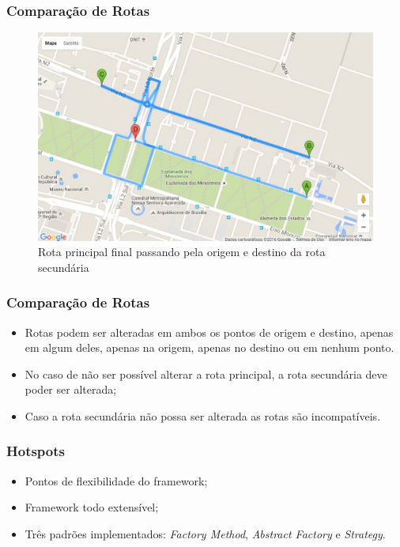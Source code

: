 \documentclass{beamer}
\begin{document}
\begin{frame}
\frametitle{Comparação de Rotas}

\begin{figure}[h]
	\centering
	\includegraphics[scale=0.35]{figuras/juncao_rotas.eps}
	\caption{Rota principal final passando pela origem e destino da rota secundária}
\end{figure}

\end{frame}

\begin{frame}
\frametitle{Comparação de Rotas}

\begin{itemize}
	\item Rotas podem ser alteradas em ambos os pontos de origem e destino, apenas em algum deles, apenas na origem, apenas no destino ou em nenhum ponto.
	\item No caso de não ser possível alterar a rota principal, a rota secundária deve poder ser alterada;
	\item Caso a rota secundária não possa ser alterada as rotas são incompatíveis.
\end{itemize}

\end{frame}

\begin{frame}
\frametitle{Hotspots}

\begin{itemize}
	\item Pontos de flexibilidade do framework;
	\item Framework todo extensível;
	\item Três padrões implementados: \textit{Factory Method}, \textit{Abstract Factory} e \textit{Strategy}.
\end{itemize}

\end{frame}
\end{document}
